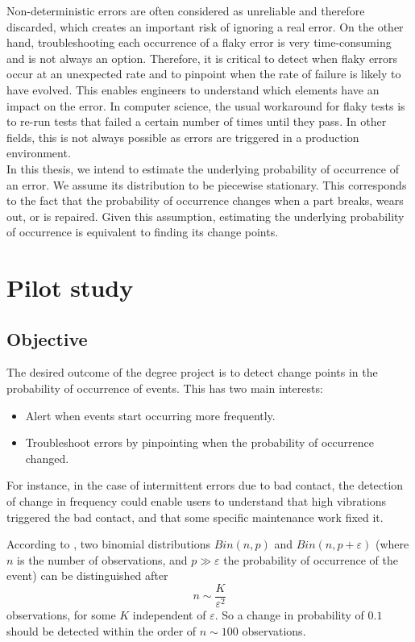 \documentclass{kththesis}
\begin{document}
Non-deterministic errors are often considered as unreliable and therefore discarded, which creates an important risk of ignoring a real error. On the other hand, troubleshooting each occurrence of a flaky error is very time-consuming and is not always an option. Therefore, it is critical to detect when flaky errors occur at an unexpected rate and to pinpoint when the rate of failure is likely to have evolved. This enables engineers to understand which elements have an impact on the error. In computer science, the usual workaround for flaky tests is to re-run tests that failed a certain number of times until they pass. In other fields, this is not always possible as errors are triggered in a production environment.\\

In this thesis, we intend to estimate the underlying probability of occurrence of an error.
We assume its distribution to be piecewise
stationary. This corresponds to the fact that the probability of
occurrence changes when a part breaks, wears out, or is repaired. Given this assumption, estimating the underlying probability of occurrence is
equivalent to finding its change points.

\clearpage

\chapter{Pilot study}

\section{Objective}

The desired outcome of the degree project is to detect change points in the probability of occurrence of events. This has two main interests:

\begin{itemize}
\item Alert when events start occurring more frequently.
\item Troubleshoot errors by pinpointing when the probability of occurrence changed.
\end{itemize}

For instance, in the case of intermittent errors due to bad contact, the detection of change in frequency could enable users to understand that high vibrations triggered the bad contact, and that some specific maintenance work fixed it.

According to \parencite{baigneres2004}, two binomial distributions $Bin(n, p)$ and $Bin(n, p+\varepsilon)$ (where $n$ is the number of observations, and $p \gg \varepsilon$ the probability of occurrence of the event) can be distinguished after 
$$n \sim \dfrac{K}{\varepsilon^2}$$
observations, for some $K$ independent of $\varepsilon$.
So a change in probability of $0.1$ should be detected within the order of $n \sim 100$ observations.
\end{document}
